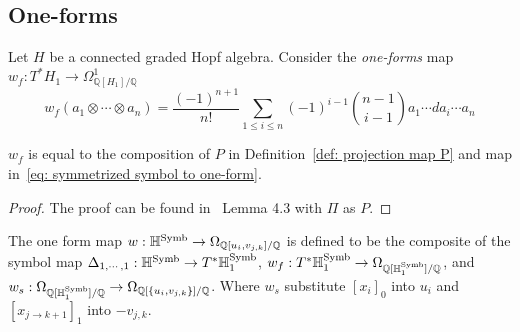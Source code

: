\subsection{One-forms}

\begin{definition}
Let $H$ be a connected graded Hopf algebra. Consider the \textit{one-forms} map $w_f:T^*H_1\to\Omega^1_{\mathbb Q[H_1]/\mathbb Q}$
\begin{equation}\label{eq: w_f}
w_f(a_1\otimes\cdots\otimes a_n)=\frac{(-1)^{n+1}}{n!}\sum_{1\leq i\leq n}(-1)^{i-1}\binom{n-1}{i-1}a_1\cdots da_i\cdots a_n
\end{equation}
\end{definition}

\begin{theorem}\label{thm: one-form map factor through Gangl's projection map P}
$w_f$ is equal to the composition of $P$ in Definition~\ref{def: projection map P} and map in~\eqref{eq: symmetrized symbol to one-form}.
\end{theorem}

\begin{proof}
The proof can be found in~\cite{ZDHZ_HopfAlgebrasOfMultiplePolylogarithmsAndHolomorphicOneForms} Lemma 4.3 with $\Pi$ as $P$.
\end{proof}






\begin{definition}\label{def: one-forms}
The one form map $w:\mathbb H^{\operatorname{Symb}}\to\Omega_{\mathbb Q[u_i,v_{j,k}]/\mathbb Q}$ is defined to be the composite of the symbol map $\Delta_{1,\cdots,1}:\mathbb H^{\operatorname{Symb}}\to T^*\mathbb H^{\operatorname{Symb}}_1$, $w_f:T^*\mathbb H^{\operatorname{Symb}}_1\to\Omega_{\mathbb Q[\mathbb H^{\operatorname{Symb}}_1]/\mathbb Q}$, and  $w_s:\Omega_{\mathbb Q[\mathbb H^{\operatorname{Symb}}_1]/\mathbb Q}\to\Omega_{\mathbb Q[\{u_i,v_{j,k}\}]/\mathbb Q}$. Where $w_s$ substitute $[x_i]_0$ into $u_i$ and $[x_{j\to k+1}]_1$ into $-v_{j,k}$.
\end{definition}


